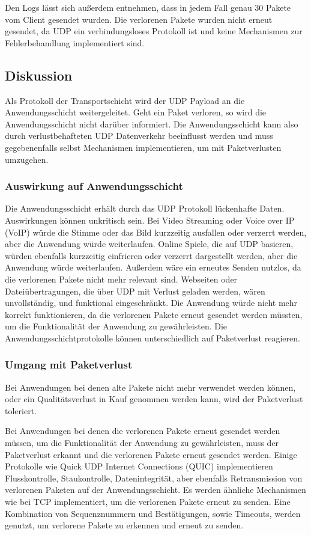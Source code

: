 Den Logs lässt sich außerdem entnehmen, dass in jedem Fall genau 30 Pakete vom Client gesendet wurden.
Die verlorenen Pakete wurden nicht erneut gesendet, da UDP ein verbindungsloses Protokoll ist und keine Mechanismen zur Fehlerbehandlung implementiert sind.

\subsection{Diskussion}
Als Protokoll der Transportschicht wird der UDP Payload an die Anwendungsschicht weitergeleitet.
Geht ein Paket verloren, so wird die Anwendungsschicht nicht darüber informiert.
Die Anwendungsschicht kann also durch verlustbehafteten UDP Datenverkehr beeinflusst werden und muss gegebenenfalls selbst Mechanismen implementieren, um mit Paketverlusten umzugehen.

\subsubsection*{Auswirkung auf Anwendungsschicht}

Die Anwendungsschicht erhält durch das UDP Protokoll lückenhafte Daten.
Auswirkungen können unkritisch sein. Bei Video Streaming oder Voice over IP (VoIP) würde die Stimme oder das Bild kurzzeitig ausfallen oder verzerrt werden, aber die Anwendung würde weiterlaufen.
Online Spiele, die auf UDP basieren, würden ebenfalls kurzzeitig einfrieren oder verzerrt dargestellt werden, aber die Anwendung würde weiterlaufen. Außerdem wäre ein erneutes Senden nutzlos, da die verlorenen Pakete nicht mehr relevant sind.
Webseiten oder Dateiübertragungen, die über UDP mit Verlust geladen werden, wären unvollständig, und funktional eingeschränkt.
Die Anwendung würde nicht mehr korrekt funktionieren, da die verlorenen Pakete erneut gesendet werden müssten, um die Funktionalität der Anwendung zu gewährleisten.
Die Anwendungsschichtprotokolle können unterschiedlich auf Paketverlust reagieren.

\subsubsection*{Umgang mit Paketverlust}

Bei Anwendungen bei denen alte Pakete nicht mehr verwendet werden können, oder ein Qualitätsverlust in Kauf genommen werden kann, wird der Paketverlust toleriert.

Bei Anwendungen bei denen die verlorenen Pakete erneut gesendet werden müssen, um die Funktionalität der Anwendung zu gewährleisten, muss der Paketverlust erkannt und die verlorenen Pakete erneut gesendet werden.
Einige Protokolle wie Quick UDP Internet Connections (QUIC) implementieren Flusskontrolle, Staukontrolle, Datenintegrität, aber ebenfalls Retransmission von verlorenen Paketen auf der Anwendungsschicht.
Es werden ähnliche Mechanismen wie bei TCP implementiert, um die verlorenen Pakete erneut zu senden.
Eine Kombination von Sequenznummern und Bestätigungen, sowie Timeouts, werden genutzt, um verlorene Pakete zu erkennen und erneut zu senden.
